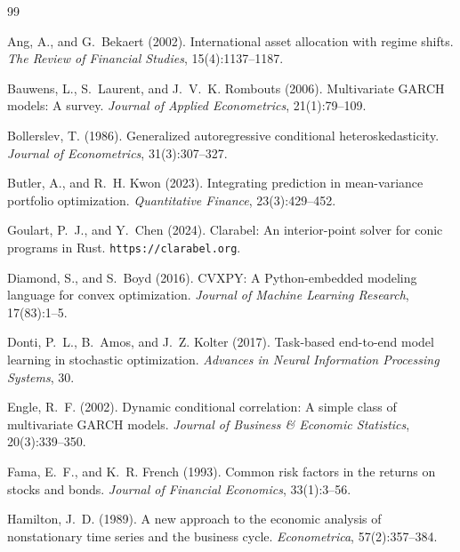 \documentclass[11pt]{article}
\begin{document}
\begin{thebibliography}{99}

Ang, A., and G.~Bekaert (2002).
\newblock International asset allocation with regime shifts.
\newblock \emph{The Review of Financial Studies}, 15(4):1137--1187.

Bauwens, L., S.~Laurent, and J.~V.~K. Rombouts (2006).
\newblock Multivariate GARCH models: A survey.
\newblock \emph{Journal of Applied Econometrics}, 21(1):79--109.

Bollerslev, T. (1986).
\newblock Generalized autoregressive conditional heteroskedasticity.
\newblock \emph{Journal of Econometrics}, 31(3):307--327.

Butler, A., and R.~H. Kwon (2023).
\newblock Integrating prediction in mean-variance portfolio optimization.
\newblock \emph{Quantitative Finance}, 23(3):429--452.

Goulart, P.~J., and Y.~Chen (2024).
\newblock Clarabel: An interior-point solver for conic programs in Rust.
\newblock \texttt{https://clarabel.org}.

Diamond, S., and S.~Boyd (2016).
\newblock CVXPY: A Python-embedded modeling language for convex optimization.
\newblock \emph{Journal of Machine Learning Research}, 17(83):1--5.

Donti, P.~L., B.~Amos, and J.~Z. Kolter (2017).
\newblock Task-based end-to-end model learning in stochastic optimization.
\newblock \emph{Advances in Neural Information Processing Systems}, 30.

Engle, R.~F. (2002).
\newblock Dynamic conditional correlation: A simple class of multivariate GARCH models.
\newblock \emph{Journal of Business \& Economic Statistics}, 20(3):339--350.

Fama, E.~F., and K.~R. French (1993).
\newblock Common risk factors in the returns on stocks and bonds.
\newblock \emph{Journal of Financial Economics}, 33(1):3--56.

Hamilton, J.~D. (1989).
\newblock A new approach to the economic analysis of nonstationary
time series and the business cycle.
\newblock \emph{Econometrica}, 57(2):357--384.


\end{thebibliography}
\end{document}
